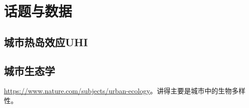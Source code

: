\chapter{话题与数据}

\section{城市热岛效应UHI}

\section{城市生态学}

\href{Nature的一个feature}{https://www.nature.com/subjects/urban-ecology}。讲得主要是城市中的生物多样性。